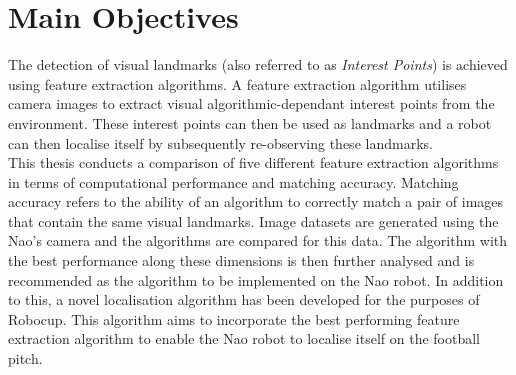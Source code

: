 \section{Main Objectives}
\label{sec:objectives}
The detection of visual landmarks (also referred to as \textit{Interest Points}) is achieved using feature extraction algorithms. A feature extraction algorithm utilises camera images to extract visual algorithmic-dependant interest points from the environment. These interest points can then be used as landmarks and a robot can then localise itself by subsequently re-observing these landmarks. \\

This thesis conducts a comparison of five different feature extraction algorithms in terms of computational performance and matching accuracy. Matching accuracy refers to the ability of an algorithm to correctly match a pair of images that contain the same visual landmarks. Image datasets are generated using the Nao's camera and the algorithms are compared for this data. The algorithm with the best performance along these dimensions is then further analysed and is recommended as the algorithm to be implemented on the Nao robot. In addition to this, a novel localisation algorithm has been developed for the purposes of Robocup. This algorithm aims to incorporate the best performing feature extraction algorithm to enable the Nao robot to localise itself on the football pitch.\\



